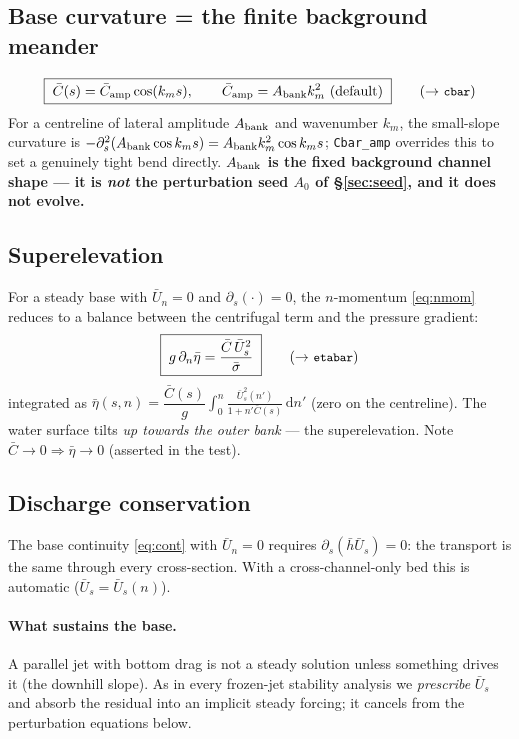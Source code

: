 \documentclass[11pt]{article}
\newcommand{\Us}{\bar U_s}
\newcommand{\ds}{\partial_s}
\newcommand{\dn}{\partial_n}
\newcommand{\code}[1]{\texttt{\small #1}}
\begin{document}
\subsection{Base curvature = the finite background meander}
\begin{equation}
  \boxed{\;\bar C(s)=\bar C_{\rm amp}\cos(k_m s),\qquad
  \bar C_{\rm amp}=A_{\rm bank}k_m^{2}\ \text{(default)}\;}
  \tag{$\to$ \code{cbar}}
\end{equation}
For a centreline of lateral amplitude $A_{\rm bank}$ and wavenumber $k_m$, the
small-slope curvature is $-\partial_s^2(A_{\rm bank}\cos k_m s)=A_{\rm bank}k_m^{2}\cos k_m s$;
\code{Cbar\_amp} overrides this to set a genuinely tight bend directly.
\textbf{$A_{\rm bank}$ is the fixed background channel shape --- it is \emph{not} the
perturbation seed $A_0$ of \S\ref{sec:seed}, and it does not evolve.}

\subsection{Superelevation}
For a steady base with $\bar U_n=0$ and $\ds(\cdot)=0$, the $n$-momentum
\eqref{eq:nmom} reduces to a balance between the centrifugal term and the pressure
gradient:
\begin{equation}
  \boxed{\;g\,\dn\bar\eta=\frac{\bar C\,\Us^{2}}{\bar\sigma}\;}
  \tag{$\to$ \code{etabar}}
  \label{eq:super}
\end{equation}
integrated as $\bar\eta(s,n)=\dfrac{\bar C(s)}{g}\displaystyle\int_0^n
\frac{\Us^{2}(n')}{1+n'\bar C(s)}\,\mathrm dn'$ (zero on the centreline). The water
surface tilts \emph{up towards the outer bank} --- the superelevation. Note
$\bar C\to0\Rightarrow\bar\eta\to0$ (asserted in the test).

\subsection{Discharge conservation}
The base continuity \eqref{eq:cont} with $\bar U_n=0$ requires
$\ds(\bar h\Us)=0$: the transport is the same through every cross-section. With a
cross-channel-only bed this is automatic ($\Us=\Us(n)$).

\paragraph{What sustains the base.} A parallel jet with bottom drag is not a
steady solution unless something drives it (the downhill slope). As in every
frozen-jet stability analysis we \emph{prescribe} $\Us$ and absorb the residual into
an implicit steady forcing; it cancels from the perturbation equations below.
\end{document}
